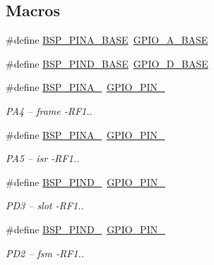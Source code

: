 \subsection*{Macros}
\begin{DoxyCompactItemize}
\item 
\#define \hyperlink{_open_mote-_c_c2538_2debugpins_8c_aaa6c07737ad04ce6b4a82ddbdfdf3e3d}{B\+S\+P\+\_\+\+P\+I\+N\+A\+\_\+\+B\+A\+SE}~\hyperlink{hw__memmap_8h_a73c0487c6e865444f89ca96f8351c81e}{G\+P\+I\+O\+\_\+\+A\+\_\+\+B\+A\+SE}
\item 
\#define \hyperlink{_open_mote-_c_c2538_2debugpins_8c_a619734ad8617bbc98a64f0e783e168ff}{B\+S\+P\+\_\+\+P\+I\+N\+D\+\_\+\+B\+A\+SE}~\hyperlink{hw__memmap_8h_a1eb15743fd9e3c8f13e6c72e6e3d9a8e}{G\+P\+I\+O\+\_\+\+D\+\_\+\+B\+A\+SE}
\item 
\#define \hyperlink{_open_mote-_c_c2538_2debugpins_8c_acfb7b70741d0a6265f538b868b390a6c}{B\+S\+P\+\_\+\+P\+I\+N\+A\+\_}~\hyperlink{_open_mote-_c_c2538_2source_2gpio_8h_ab3871e35868deecd260e586ad70d4b83}{G\+P\+I\+O\+\_\+\+P\+I\+N\+\_}
\begin{DoxyCompactList}\small\item\em P\+A4 -- frame -\/\+R\+F1.. \end{DoxyCompactList}\item 
\#define \hyperlink{_open_mote-_c_c2538_2debugpins_8c_a18ac2f5dfce225343af3b486a4ba1fdf}{B\+S\+P\+\_\+\+P\+I\+N\+A\+\_}~\hyperlink{_open_mote-_c_c2538_2source_2gpio_8h_a01cc9ed93f6fd12fd3403362779aaa18}{G\+P\+I\+O\+\_\+\+P\+I\+N\+\_}
\begin{DoxyCompactList}\small\item\em P\+A5 -- isr -\/\+R\+F1.. \end{DoxyCompactList}\item 
\#define \hyperlink{_open_mote-_c_c2538_2debugpins_8c_a73eff0b21371736cb99c553297f342d0}{B\+S\+P\+\_\+\+P\+I\+N\+D\+\_}~\hyperlink{_open_mote-_c_c2538_2source_2gpio_8h_adcaf899c018a0dde572b5af783565c62}{G\+P\+I\+O\+\_\+\+P\+I\+N\+\_}
\begin{DoxyCompactList}\small\item\em P\+D3 -- slot -\/\+R\+F1.. \end{DoxyCompactList}\item 
\#define \hyperlink{_open_mote-_c_c2538_2debugpins_8c_a78684e3a753bc8167efdd2fd1371025c}{B\+S\+P\+\_\+\+P\+I\+N\+D\+\_}~\hyperlink{_open_mote-_c_c2538_2source_2gpio_8h_a6eee38b797a7268f04357dfa2759efd2}{G\+P\+I\+O\+\_\+\+P\+I\+N\+\_}
\begin{DoxyCompactList}\small\item\em P\+D2 -- fsm -\/\+R\+F1.. \end{DoxyCompactList}\item 

\end{DoxyCompactItemize}
